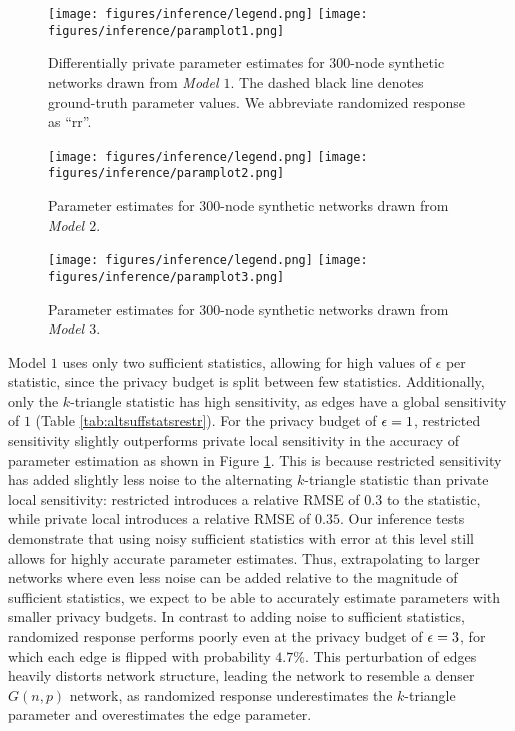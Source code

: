   \begin{figure}[!h]
 \caption{Differentially private parameter estimates for $300$-node synthetic networks drawn from \emph{Model $\mathit{1}$}. The dashed black line denotes ground-truth parameter values. We abbreviate randomized response as ``rr''.}
 \centering 
 \texttt{[image: figures/inference/legend.png]}
 \texttt{[image: figures/inference/paramplot1.png]}
 \label{fig:edgeinfsynth1}
\end{figure}

  \begin{figure}[!h]
	\caption{Parameter estimates for $300$-node synthetic networks drawn from \emph{Model $\mathit{2}$}.}
	\centering 
	\texttt{[image: figures/inference/legend.png]}
	\texttt{[image: figures/inference/paramplot2.png]}
	\label{fig:edgeinfsynth2}
\end{figure}
 
  \begin{figure}[!h]
	\caption{Parameter estimates for $300$-node synthetic networks drawn from \emph{Model $\mathit{3}$}.}
	\centering 
	\texttt{[image: figures/inference/legend.png]}
	\texttt{[image: figures/inference/paramplot3.png]}
	\label{fig:edgeinfsynth3}
\end{figure}

Model $1$ uses only two sufficient statistics, allowing for high values of $\epsilon$ per statistic, since the privacy budget is split between few statistics. Additionally, only the $k$-triangle statistic has high sensitivity, as edges have a global sensitivity of $1$ (Table \ref{tab:altsuffstatsrestr}). For the privacy budget of $\epsilon=1$, restricted sensitivity slightly outperforms private local sensitivity in the accuracy of parameter estimation as shown in Figure \ref{fig:edgeinfsynth1}. This is because restricted sensitivity has added slightly less noise to the alternating $k$-triangle statistic than private local sensitivity: restricted introduces a relative RMSE of $0.3$ to the statistic, while private local introduces a relative RMSE of $0.35$. Our inference tests demonstrate that using noisy sufficient statistics with error at this level still allows for highly accurate parameter estimates. Thus, extrapolating to larger networks where even less noise can be added relative to the magnitude of sufficient statistics, we expect to be able to accurately estimate parameters with smaller privacy budgets. In contrast to adding noise to sufficient statistics, randomized response performs poorly even at the privacy budget of $\epsilon = 3$, for which each edge is flipped with probability $4.7\%$. This perturbation of edges heavily distorts network structure, leading the network to resemble a denser $G(n,p)$ network, as randomized response underestimates the $k$-triangle parameter and overestimates the edge parameter.

